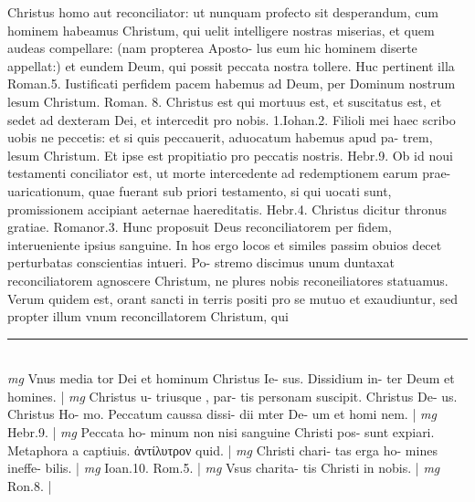 \documentclass{article}
\begin{document}
\begin{pages}
Christus homo aut reconciliator: ut nunquam profecto sit desperandum, cum hominem habeamus Christum, qui uelit intelligere nostras miserias, et quem audeas compellare: (nam propterea Aposto- lus eum hic hominem diserte appellat:) et eundem Deum, qui possit peccata nostra    tollere. Huc pertinent illa Roman.5. Iustificati perfidem pacem habemus ad Deum,    per Dominum nostrum lesum Christum. Roman. 8. Christus est qui mortuus est, et suscitatus est, et sedet ad dexteram Dei, et intercedit pro nobis. 1.Iohan.2. Filioli mei    haec scribo uobis ne peccetis: et si quis peccauerit, aduocatum habemus apud pa-    trem, lesum Christum. Et ipse est propitiatio pro peccatis nostris. Hebr.9. Ob id    noui testamenti conciliator est, ut morte intercedente ad redemptionem earum prae- uaricationum, quae fuerant sub priori testamento, si qui uocati sunt, promissionem accipiant aeternae haereditatis. Hebr.4. Christus dicitur thronus gratiae. Romanor.3. Hunc proposuit Deus reconciliatorem per fidem, interueniente ipsius sanguine. In hos ergo locos et similes passim obuios decet perturbatas conscientias intueri. Po- stremo discimus unum duntaxat reconciliatorem agnoscere Christum, ne plures nobis reconeiliatores statuamus. Verum quidem est, orant sancti in terris positi pro se mutuo et exaudiuntur, sed propter illum vnum reconcillatorem Christum, qui  \pend
\vspace{0.5cm}\noindent
\vspace{0.2cm}\rule{1cm}{0.2pt}\\ 
\hspace{0.2cm}\textit{mg}
\footnotesize Vnus media tor Dei et hominum Christus Ie- sus. Dissidium in- ter Deum et homines. 
\normalsize| 
\hspace{0.2cm}\textit{mg}
\footnotesize Christus u- triusque , par- tis personam suscipit. Christus De- us. Christus Ho- mo. Peccatum caussa dissi- dii mter De- um et homi nem. 
\normalsize| 
\hspace{0.2cm}\textit{mg}
\footnotesize Hebr.9. 
\normalsize| 
\hspace{0.2cm}\textit{mg}
\footnotesize Peccata ho- minum non nisi sanguine Christi pos- sunt expiari. Metaphora a captiuis. ἀντίλυτρον quid. 
\normalsize| 
\hspace{0.2cm}\textit{mg}
\footnotesize Christi chari- tas erga ho- mines ineffe- bilis. 
\normalsize| 
\hspace{0.2cm}\textit{mg}
\footnotesize Ioan.10. Rom.5. 
\normalsize| 
\hspace{0.2cm}\textit{mg}
\footnotesize Vsus charita- tis Christi in nobis. 
\normalsize| 
\hspace{0.2cm}\textit{mg}
\footnotesize Ron.8. 
\normalsize| 

\end{pages}
\end{document}
